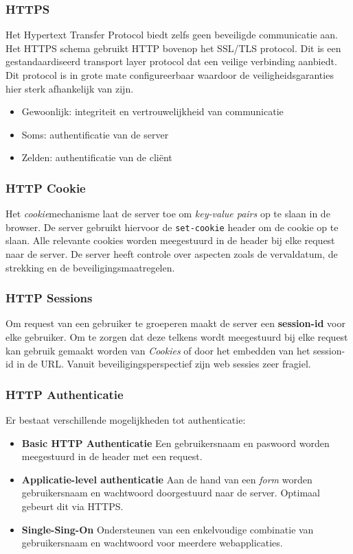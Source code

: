 \documentclass[../main.tex]{subfiles}
\begin{document}
\subsubsection{HTTPS}
Het Hypertext Transfer Protocol biedt zelfs geen beveiligde communicatie aan. Het HTTPS schema gebruikt HTTP bovenop het SSL/TLS protocol. Dit is een gestandaardiseerd transport layer protocol dat een veilige verbinding aanbiedt. Dit protocol is in grote mate configureerbaar waardoor de veiligheidsgaranties hier sterk afhankelijk van zijn.
\begin{itemize}
	\item Gewoonlijk: integriteit en vertrouwelijkheid van communicatie
	\item Soms: authentificatie van de server
	\item Zelden: authentificatie van de cli\"ent
\end{itemize}

\subsubsection{HTTP Cookie}
Het \textit{cookie}mechanisme laat de server toe om \textit{key-value pairs} op te slaan in de browser. De server gebruikt hiervoor de \texttt{set-cookie} header om de cookie op te slaan. Alle relevante cookies worden meegestuurd in de header bij elke request naar de server. De server heeft controle over aspecten zoals de vervaldatum, de strekking en de beveiligingsmaatregelen.

\subsubsection{HTTP Sessions}
Om request van een gebruiker te groeperen maakt de server een \textbf{session-id} voor elke gebruiker. Om te zorgen dat deze telkens wordt meegestuurd bij elke request kan gebruik gemaakt worden van \textit{Cookies} of door het embedden van het session-id in de URL. Vanuit beveiligingsperspectief zijn web sessies zeer fragiel.  

\subsubsection{HTTP Authenticatie}
Er bestaat verschillende mogelijkheden tot authenticatie:
\begin{itemize}
	\item \textbf{Basic HTTP Authenticatie} Een gebruikersnaam en paswoord worden meegestuurd in de header met een request.
	\item \textbf{Applicatie-level authenticatie} Aan de hand van een \textit{form} worden gebruikersnaam en wachtwoord doorgestuurd naar de server. Optimaal gebeurt dit via HTTPS.
	\item \textbf{Single-Sing-On} Ondersteunen van een enkelvoudige combinatie van gebruikersnaam en wachtwoord voor meerdere webapplicaties.
\end{itemize}
\end{document}
